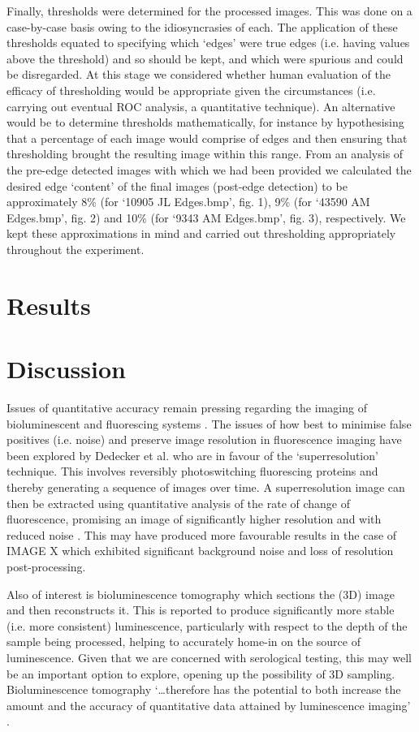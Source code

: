 \documentclass[a4paper]{article}
\begin{document}
\begin{multicols*}{2}
Finally, thresholds were determined for the processed images. This was done on a case-by-case basis owing to the idiosyncrasies of each. The application of these thresholds equated to specifying which ‘edges’ were true edges (i.e. having values above the threshold) and so should be kept, and which were spurious and could be disregarded. At this stage we considered whether human evaluation of the efficacy of thresholding would be appropriate given the circumstances (i.e. carrying out eventual ROC analysis, a quantitative technique). An alternative would be to determine thresholds mathematically, for instance by hypothesising that a percentage of each image would comprise of edges and then ensuring that thresholding brought the resulting image within this range. From an analysis of the pre-edge detected images with which we had been provided we calculated the desired edge ‘content’ of the final images (post-edge detection) to be approximately 8\% (for ‘10905 JL Edges.bmp’, fig. 1), 9\% (for ‘43590 AM Edges.bmp’, fig. 2) and 10\% (for ‘9343 AM Edges.bmp’, fig. 3), respectively. We kept these approximations in mind and carried out thresholding appropriately throughout the experiment.

\section*{Results}

\section*{Discussion}

Issues of quantitative accuracy remain pressing regarding the imaging of bioluminescent and fluorescing systems \citep{taylor2015accounting}. 
The issues of how best to minimise false positives (i.e. noise) and preserve image resolution in fluorescence imaging have been explored by Dedecker et al. who are in favour of the ‘superresolution’ technique. This involves reversibly photoswitching fluorescing proteins and thereby generating a sequence of images over time. A superresolution image can then be extracted using quantitative analysis of the rate of change of fluorescence, promising an image of significantly higher resolution and with reduced noise \citep{dedecker2012widely}. This may have produced more favourable results in the case of IMAGE X which exhibited significant background noise and loss of resolution post-processing.

Also of interest is bioluminescence tomography which sections the (3D) image and then reconstructs it. This is reported to produce significantly more stable (i.e. more consistent) luminescence, particularly with respect to the depth of the sample being processed, helping to accurately home-in on the source of luminescence. Given that we are concerned with serological testing, this may well be an important option to explore, opening up the possibility of 3D sampling. Bioluminescence tomography ‘…therefore has the potential to both increase the amount and the accuracy of quantitative data attained by luminescence imaging’ \citep{guggenheim2013bioluminescence}.




\end{multicols*}
\end{document}
